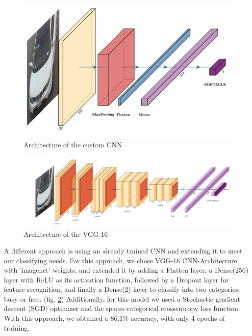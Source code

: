 \documentclass[runningheads,a4paper,11pt]{report}
\begin{document}
\begin{figure}[htbp]
	\centerline{\includegraphics{images/Architecture}}  
	\caption{Architecture of the custom CNN}
	\label{fig:architectureimg}
\end{figure}

\begin{figure}[htbp]
	\centerline{\includegraphics[width=18cm]{images/vgg16}}  
	\caption{Architecture of the VGG-16}
	\label{fig:vggarchitecture}
\end{figure}
  
\par
A different approach is using an already trained CNN and extending it to meet our classifying needs.
For this approach, we chose VGG-16 CNN-Architecture with 'imagenet' weights, and extended it by adding a Flatten layer, a Dense(256) layer with ReLU as its activation
function, followed by a Dropout layer for feature-recognition, and finally a Dense(2) layer to classify into two categories: busy or free. (fig. \ref{fig:vggarchitecture})
Additionally, for this model we used a Stochastic gradient descent (SGD) optimizer and the sparse-categorical crossentropy loss function.
With this approach, we obtained a 86.1\% accuracy, with only 4 epochs of training.
  
\end{document}
